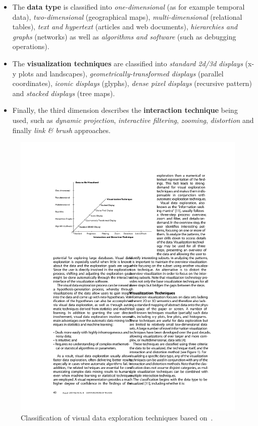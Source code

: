 \begin{itemize}

\item The \textbf{data type} is classified into \textit{one-dimensional} (as for example temporal data), \textit{two-dimensional} (geographical maps), \textit{multi-dimensional} (relational tables), \textit{text and hypertext} (articles and web documents), \textit{hierarchies and graphs} (networks) as well as \textit{algorithms and software} (such as debugging operations).

\item The \textbf{visualization techniques} are classified into \textit{standard 2d/3d displays} (x-y plots and landscapes), \textit{geometrically-transformed displays} (parallel coordinates), \textit{iconic displays} (glyphs), \textit{dense pixel displays} (recursive pattern) and \textit{stacked displays} (tree maps).

\item Finally, the third dimension describes the \textbf{interaction technique} being used, such as \textit{dynamic projection}, \textit{interactive filtering}, \textit{zooming}, \textit{distortion} and finally \textit{link \& brush} approaches.

\end{itemize}

\begin{figure}[h]
  \begin{center}
    \includegraphics[width=1\textwidth]{figures/classes_visual_techniques.pdf}
    \caption{Classification of visual data exploration techniques based on~\cite{keim2001vis}.}
    \label{fig:visual-techniques}
  \end{center}
\end{figure}


